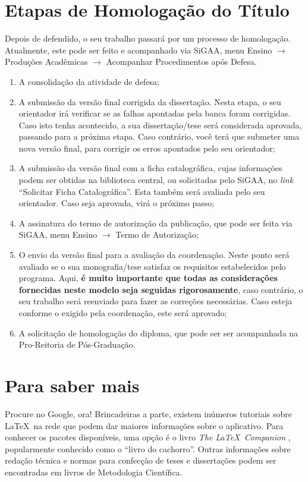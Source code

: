 \section{Etapas de Homologação do Título}

Depois de defendido, o seu trabalho passará por um processo de homologação. Atualmente, este pode ser feito e acompanhado via SiGAA, menu Ensino $\rightarrow$ Produções Acadêmicas $\rightarrow$ Acompanhar Procedimentos após Defesa.
\begin{enumerate}
	\item A consolidação da atividade de defesa;
	\item A submissão da versão final corrigida da dissertação. Nesta etapa, o seu orientador irá verificar se as falhas apontadas pela banca foram corrigidas. Caso isto tenha acontecido, a sua dissertação/tese será considerada aprovada, passando para a próxima etapa. Caso contrário, você terá que submeter uma nova versão final, para corrigir os erros apontados pelo seu orientador;
	\item A submissão da versão final com a ficha catalográfica, cujas informações podem ser obtidas na biblioteca central, ou solicitadas pelo SiGAA, no \textit{link} ``Solicitar Ficha Catalográfica''. Esta também será avaliada pelo seu orientador. Caso seja aprovada, virá o próximo passo;
	\item A assinatura do termo de autorização da publicação, que pode ser feita via SiGAA, menu Ensino $\rightarrow$ Termo de Autorização;
	\item O envio da versão final para a avaliação da coordenação. Neste ponto será avaliado se o sua monografia/tese satisfaz os requisitos estabelecidos pelo programa. Aqui, \textbf{é muito importante que todas as considerações fornecidas neste modelo seja seguidas rigorosamente}, caso contrário, o seu trabalho será reenviado para fazer as correções necessárias. Caso esteja conforme o exigido pela coordenação, este será aprovado;
	\item A solicitação de homologação do diploma, que pode ser ser acompanhada na Pro-Reitoria de Pós-Graduação.
\end{enumerate}

\section{Para saber mais}

Procure no Google, ora! Brincadeiras a parte, existem inúmeros
tutoriais sobre \LaTeX\ na rede que podem dar maiores informações
sobre o aplicativo. Para conhecer os pacotes disponíveis, uma opção é
o livro \emph{The \LaTeX\ Companion} \cite{LATEX04}, popularmente
conhecido como o ``livro do cachorro''. Outras informações sobre
redação técnica e normas para confecção de teses e dissertações podem
ser encontradas em livros de Metodologia Científica.
